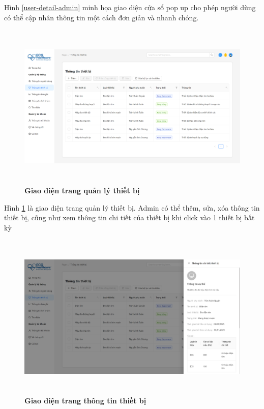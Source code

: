 Hình \ref{user-detail-admin} minh họa giao diện cửa sổ pop up cho phép người dùng có thể cập nhân thông tin một cách đơn giản và nhanh chóng.

\begin{figure}[H]
	\centering
	\includegraphics[width=15cm,height=8cm]{Images/admin_ui/devices.png}
	\caption[Giao diện trang quản lý thiết bị]{\bfseries \fontsize{12pt}{0pt}\selectfont Giao diện trang quản lý thiết bị}
	\label{devices-admin}
\end{figure}

Hình \ref{devices-admin} là giao diện trang quản lý thiết bị.  Admin có thể thêm, sửa, xóa thông tin thiết bị, cũng như xem thông tin chi tiết của thiết bị khi click vào 1 thiết bị bất kỳ

\begin{figure}[H]
	\centering
	\includegraphics[width=15cm,height=8cm]{Images/admin_ui/device-info.png}
	\caption[Giao diện trang thông tin thiết bị]{\bfseries \fontsize{12pt}{0pt}\selectfont Giao diện trang thông tin thiết bị}
	\label{device-info-admin}
\end{figure}

